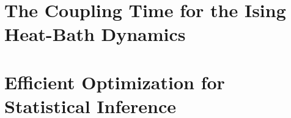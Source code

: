 \documentclass[11pt, oneside]{Thesis} %
\begin{document}
%
%







\mainmatter %

\pagestyle{fancy} %


\part{The Coupling Time for the Ising Heat-Bath Dynamics}
\label{part:coupling time}







\part{Efficient Optimization for Statistical Inference}
\label{part:optimization for stats}
\end{document}
